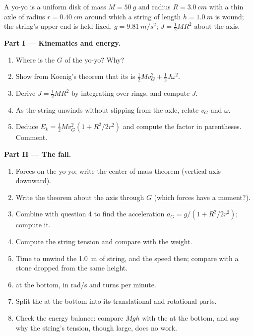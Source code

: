 \begin{problem}
\label{pb:b1:systems-of-points:1}
A yo-yo is a uniform disk of mass $M = \qty{50}{g}$ and radius $R =
\qty{3.0}{cm}$ with a thin axle of radius $r = \qty{0.40}{cm}$ around
which a string of length $h = \qty{1.0}{m}$ is wound; the string's upper
end is held fixed. $g = \qty{9.81}{m/s^2}$; $J = \tfrac12 MR^2$ about the
axis.

\medskip
\noindent\textbf{Part I --- Kinematics and energy.}
\begin{enumerate}
  \item Where is the  $G$ of the yo-yo? Why?
  \item Show from Koenig's theorem that its  is $\tfrac12
        Mv_G^2 + \tfrac12 J\omega^2$.
  \item Derive $J = \tfrac12 MR^2$ by integrating over rings, and compute
        $J$.
  \item As the string unwinds without slipping from the axle, relate
        $v_G$ and $\omega$.
  \item Deduce $E_k = \tfrac12 Mv_G^2(1 + R^2/2r^2)$ and compute the
        factor in parentheses. Comment.
\end{enumerate}

\medskip
\noindent\textbf{Part II --- The fall.}
\begin{enumerate}[resume]
  \item Forces on the yo-yo; write the center-of-mass theorem
        (vertical axis downward).
  \item Write the  theorem about the axis through $G$
        (which forces have a moment?).
  \item Combine with question 4 to find the acceleration $a_G = g/(1 +
        R^2/2r^2)$; compute it.
  \item Compute the string tension and compare with the weight.
  \item Time to unwind the \qty{1.0}{m} of string, and the speed then;
        compare with a stone dropped from the same height.
  \item {} at the bottom, in rad/s and turns per minute.
  \item Split the  at the bottom into its translational
        and rotational parts.
  \item Check the energy balance: compare $Mgh$ with the 
        at the bottom, and say why the string's tension, though large,
        does no work.
\end{enumerate}


\end{problem}
